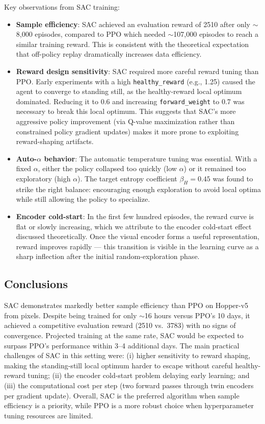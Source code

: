 \documentclass[onecolumn]{cwpreport} %
\begin{document}
Key observations from SAC training:
\begin{itemize}
    \item \textbf{Sample efficiency}: SAC achieved an evaluation reward of 2510 after only $\sim$8{,}000 episodes, compared to PPO which needed $\sim$107{,}000 episodes to reach a similar training reward. This is consistent with the theoretical expectation that off-policy replay dramatically increases data efficiency.
    \item \textbf{Reward design sensitivity}: SAC required more careful reward tuning than PPO. Early experiments with a high \texttt{healthy\_reward} (e.g., 1.25) caused the agent to converge to standing still, as the healthy-reward local optimum dominated. Reducing it to 0.6 and increasing \texttt{forward\_weight} to 0.7 was necessary to break this local optimum. This suggests that SAC's more aggressive policy improvement (via Q-value maximization rather than constrained policy gradient updates) makes it more prone to exploiting reward-shaping artifacts.
    \item \textbf{Auto-$\alpha$ behavior}: The automatic temperature tuning was essential. With a fixed $\alpha$, either the policy collapsed too quickly (low $\alpha$) or it remained too exploratory (high $\alpha$). The target entropy coefficient $\beta_H = 0.45$ was found to strike the right balance: encouraging enough exploration to avoid local optima while still allowing the policy to specialize.
    \item \textbf{Encoder cold-start}: In the first few hundred episodes, the reward curve is flat or slowly increasing, which we attribute to the encoder cold-start effect discussed theoretically. Once the visual encoder forms a useful representation, reward improves rapidly — this transition is visible in the learning curve as a sharp inflection after the initial random-exploration phase.
\end{itemize}

\subsection{Conclusions}

SAC demonstrates markedly better sample efficiency than PPO on Hopper-v5 from pixels. Despite being trained for only $\sim$16 hours versus PPO's 10 days, it achieved a competitive evaluation reward (2510 vs.\ 3783) with no signs of convergence. Projected training at the same rate, SAC would be expected to surpass PPO's performance within 3--4 additional days. The main practical challenges of SAC in this setting were: (i) higher sensitivity to reward shaping, making the standing-still local optimum harder to escape without careful healthy-reward tuning; (ii) the encoder cold-start problem delaying early learning; and (iii) the computational cost per step (two forward passes through twin encoders per gradient update). Overall, SAC is the preferred algorithm when sample efficiency is a priority, while PPO is a more robust choice when hyperparameter tuning resources are limited.
\end{document}
